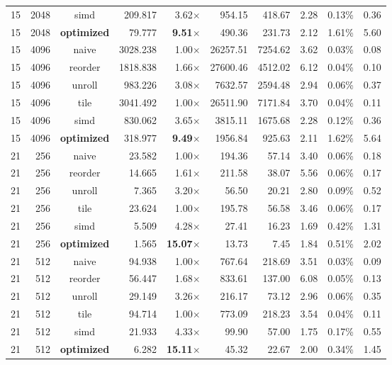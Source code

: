 \documentclass[11pt,a4paper]{article}
\begin{document}
{\begin{longtable}{rrcrrrrrrr}
15 & 2048 & simd & 209.817 & 3.62$\times$ & 954.15 & 418.67 & 2.28 & 0.13\% & 0.36 \\
15 & 2048 & \textbf{optimized} & 79.777 & \textbf{9.51$\times$} & 490.36 & 231.73 & 2.12 & 1.61\% & 5.60 \\
\midrule
15 & 4096 & naive & 3028.238 & 1.00$\times$ & 26257.51 & 7254.62 & 3.62 & 0.03\% & 0.08 \\
15 & 4096 & reorder & 1818.838 & 1.66$\times$ & 27600.46 & 4512.02 & 6.12 & 0.04\% & 0.10 \\
15 & 4096 & unroll & 983.226 & 3.08$\times$ & 7632.57 & 2594.48 & 2.94 & 0.06\% & 0.37 \\
15 & 4096 & tile & 3041.492 & 1.00$\times$ & 26511.90 & 7171.84 & 3.70 & 0.04\% & 0.11 \\
15 & 4096 & simd & 830.062 & 3.65$\times$ & 3815.11 & 1675.68 & 2.28 & 0.12\% & 0.36 \\
15 & 4096 & \textbf{optimized} & 318.977 & \textbf{9.49$\times$} & 1956.84 & 925.63 & 2.11 & 1.62\% & 5.64 \\
\midrule
21 & 256 & naive & 23.582 & 1.00$\times$ & 194.36 & 57.14 & 3.40 & 0.06\% & 0.18 \\
21 & 256 & reorder & 14.665 & 1.61$\times$ & 211.58 & 38.07 & 5.56 & 0.06\% & 0.17 \\
21 & 256 & unroll & 7.365 & 3.20$\times$ & 56.50 & 20.21 & 2.80 & 0.09\% & 0.52 \\
21 & 256 & tile & 23.624 & 1.00$\times$ & 195.78 & 56.58 & 3.46 & 0.06\% & 0.17 \\
21 & 256 & simd & 5.509 & 4.28$\times$ & 27.41 & 16.23 & 1.69 & 0.42\% & 1.31 \\
21 & 256 & \textbf{optimized} & 1.565 & \textbf{15.07$\times$} & 13.73 & 7.45 & 1.84 & 0.51\% & 2.02 \\
\midrule
21 & 512 & naive & 94.938 & 1.00$\times$ & 767.64 & 218.69 & 3.51 & 0.03\% & 0.09 \\
21 & 512 & reorder & 56.447 & 1.68$\times$ & 833.61 & 137.00 & 6.08 & 0.05\% & 0.13 \\
21 & 512 & unroll & 29.149 & 3.26$\times$ & 216.17 & 73.12 & 2.96 & 0.06\% & 0.35 \\
21 & 512 & tile & 94.714 & 1.00$\times$ & 773.09 & 218.23 & 3.54 & 0.04\% & 0.11 \\
21 & 512 & simd & 21.933 & 4.33$\times$ & 99.90 & 57.00 & 1.75 & 0.17\% & 0.55 \\
21 & 512 & \textbf{optimized} & 6.282 & \textbf{15.11$\times$} & 45.32 & 22.67 & 2.00 & 0.34\% & 1.45 \\

\end{longtable}}
\end{document}
